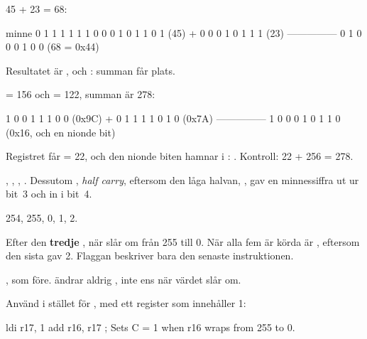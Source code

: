 %


45 + 23 = 68:

\begin{textdrawing}
   minne     0 1 1 1 1 1 1 0
             0 0 1 0 1 1 0 1     (45)
         +   0 0 0 1 0 1 1 1     (23)
             ---------------
             0 1 0 0 0 1 0 0     (68 = 0x44)
\end{textdrawing}

\noindent Resultatet är , och : summan får plats.

 = 156 och  = 122, summan är 278:

\begin{textdrawing}
             1 0 0 1 1 1 0 0     (0x9C)
         +   0 1 1 1 1 0 1 0     (0x7A)
             ---------------
         1   0 0 0 1 0 1 1 0     (0x16, och en nionde bit)
\end{textdrawing}

\noindent Registret får  = 22, och den nionde biten hamnar i :
\textbf{}. Kontroll: 22 + 256 = 278.

, , , . Dessutom
\textbf{}, \emph{half carry}, eftersom den låga halvan, , gav en
minnessiffra ut ur bit~3 och in i bit~4.

254, 255, 0, 1, 2.

Efter den \textbf{tredje} , när  slår om från 255 till 0. När alla fem är
körda är , eftersom den sista  gav 2. Flaggan beskriver bara den senaste
instruktionen.

, som före.  ändrar aldrig , inte ens när värdet slår om.

Använd  i stället för , med ett register som innehåller 1:

\begin{asmcode}
    ldi r17, 1
    add r16, r17                    ; Sets C = 1 when r16 wraps from 255 to 0.
\end{asmcode}

